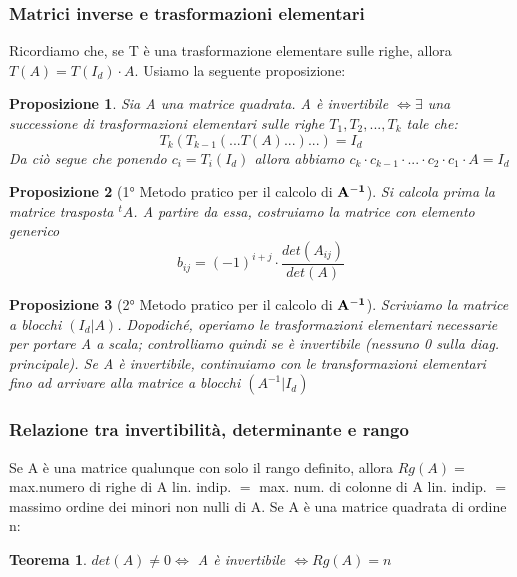 \documentclass[12pt]{article}
\newenvironment{para}{\begin{adjustwidth}{13mm}{}}{\end{adjustwidth}}
\newtheorem{Teorema}{Teorema}[subsection]
\newtheorem{Proposizione}{Proposizione}[subsection]
\begin{document}
\begin{para}
\subsubsection{Matrici inverse e trasformazioni elementari}
Ricordiamo che, se T è una trasformazione elementare sulle righe, allora $T(A) = T(I_d)\cdot A$. Usiamo la seguente proposizione:
\begin{Proposizione}
    Sia A una matrice quadrata. A è invertibile $\Leftrightarrow \exists $ una successione di trasformazioni elementari sulle righe $T_1, T_2, ..., T_k$ tale che: $$T_k(T_{k-1}(...T(A)...)...) = I_d$$
    Da ciò segue che ponendo $c_i = T_i(I_d)$ allora abbiamo $c_k\cdot c_{k-1} \cdot ... \cdot c_2 \cdot c_1 \cdot A = I_d$
\end{Proposizione}
\begin{Proposizione}[1° Metodo pratico per il calcolo di $\bold{A^{-1}}$]
Si calcola prima la matrice trasposta $^tA$. A partire da essa, costruiamo la matrice con elemento generico $$b_{ij} = (-1)^{i+j}\cdot \frac{det(A_{ij})}{det(A)}$$
\end{Proposizione}
\begin{Proposizione}[2° Metodo pratico per il calcolo di $\bold{A^{-1}}$]
    Scriviamo la matrice a blocchi $(I_d|A)$. Dopodiché, operiamo le trasformazioni elementari necessarie per portare A a scala; controlliamo quindi se è invertibile (nessuno 0 sulla diag. principale). Se A è invertibile, continuiamo con le transformazioni elementari fino ad arrivare alla matrice a blocchi $(A^{-1}|I_d)$
\end{Proposizione}
\subsubsection{Relazione tra invertibilità, determinante e rango}
Se A è una matrice qualunque con solo il rango definito, allora $Rg(A) = $ max.numero di righe di A lin. indip. $= $ max. num. di colonne di A lin. indip. $= $ massimo ordine dei minori non nulli di A.
\newline
Se A è una matrice quadrata di ordine n:
\begin{Teorema}
    $det(A) \neq 0 \Leftrightarrow $ A è invertibile $\Leftrightarrow Rg(A) = n$
\end{Teorema}

\end{para}
\end{document}
